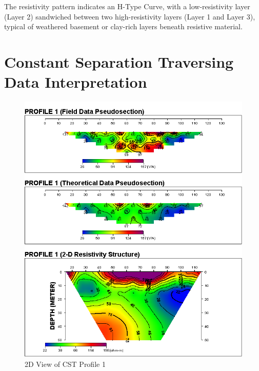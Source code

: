 \documentclass[12pt,a4paper]{report}
\begin{document}
The resistivity pattern indicates an H-Type Curve, with a low-resistivity layer (Layer 2) sandwiched between two high-resistivity layers (Layer 1 and Layer 3), typical of weathered basement or clay-rich layers beneath resistive material.

\section{Constant Separation Traversing Data Interpretation}

\begin{figure}[H]
    \centering
    \includegraphics[width=1.0\textwidth]{PROFILE 1D.png}
    \caption{2D View of CST Profile 1}
    \label{fig:UI_CST_1_Curve}
\end{figure}
\end{document}
